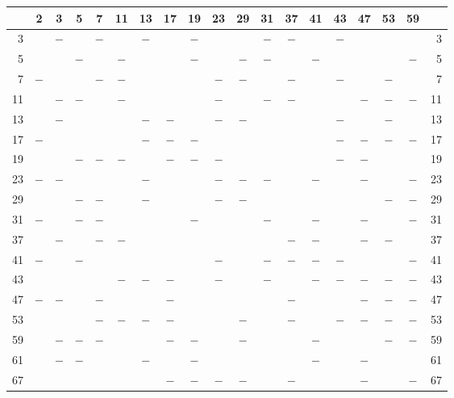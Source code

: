 %
\begin{center}\begingroup\fontsize{8}{10.5}\selectfont\setlength{\tabcolsep}{2pt}
\begin{tabular}{r|c|c|c|c|c|c|c|c|c|c|c|c|c|c|c|c|c|r}
\hline
 & 2 & 3 & 5 & 7 & 11 & 13 & 17 & 19 & 23 & 29 & 31 & 37 & 41 & 43 & 47 & 53 & 59 & \\
\hline
3 &  & $-$ &  & $-$ &  & $-$ &  & $-$ &  &  & $-$ & $-$ &  & $-$ &  &  &  & 3\\
5 &  &  & $-$ &  & $-$ &  &  & $-$ &  & $-$ & $-$ &  & $-$ &  &  &  & $-$ & 5\\
7 & $-$ &  &  & $-$ & $-$ &  &  &  & $-$ & $-$ &  & $-$ &  & $-$ &  & $-$ &  & 7\\
11 &  & $-$ & $-$ &  & $-$ &  &  &  & $-$ &  & $-$ & $-$ &  &  & $-$ & $-$ & $-$ & 11\\
13 &  & $-$ &  &  &  & $-$ & $-$ &  & $-$ & $-$ &  &  &  & $-$ &  & $-$ &  & 13\\
17 & $-$ &  &  &  &  & $-$ & $-$ & $-$ &  &  &  &  &  & $-$ & $-$ & $-$ & $-$ & 17\\
19 &  &  & $-$ & $-$ & $-$ &  & $-$ & $-$ & $-$ &  &  &  &  & $-$ & $-$ &  &  & 19\\
23 & $-$ & $-$ &  &  &  & $-$ &  &  & $-$ & $-$ & $-$ &  & $-$ &  & $-$ &  & $-$ & 23\\
29 &  &  & $-$ & $-$ &  & $-$ &  &  & $-$ & $-$ &  &  &  &  &  & $-$ & $-$ & 29\\
31 & $-$ &  & $-$ & $-$ &  &  &  & $-$ &  &  & $-$ &  & $-$ &  & $-$ &  & $-$ & 31\\
37 &  & $-$ &  & $-$ & $-$ &  &  &  &  &  &  & $-$ & $-$ &  & $-$ & $-$ &  & 37\\
41 & $-$ &  & $-$ &  &  &  &  &  & $-$ &  & $-$ & $-$ & $-$ & $-$ &  &  & $-$ & 41\\
43 &  &  &  &  & $-$ & $-$ & $-$ &  & $-$ &  & $-$ &  & $-$ & $-$ & $-$ & $-$ & $-$ & 43\\
47 & $-$ & $-$ &  & $-$ &  &  & $-$ &  &  &  &  & $-$ &  &  & $-$ & $-$ & $-$ & 47\\
53 &  &  &  & $-$ & $-$ & $-$ & $-$ &  &  & $-$ &  & $-$ &  & $-$ & $-$ & $-$ & $-$ & 53\\
59 &  & $-$ & $-$ & $-$ &  &  & $-$ & $-$ &  & $-$ &  &  & $-$ &  &  & $-$ & $-$ & 59\\
61 &  & $-$ & $-$ &  &  & $-$ &  & $-$ &  &  &  &  & $-$ &  & $-$ &  &  & 61\\
67 &  &  &  &  &  &  & $-$ & $-$ & $-$ & $-$ &  & $-$ &  &  & $-$ &  & $-$ & 67\\

\end{tabular}
\end{center}
